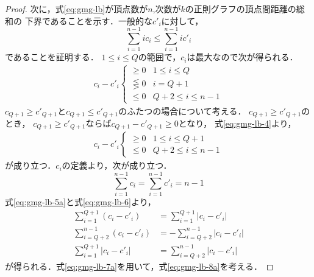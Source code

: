 \begin{proof}
  次に，式\eqref{eq:gmg-lb}が頂点数が$n$,次数が$k$の正則グラフの頂点間距離の総和の
  下界であることを示す．一般的な$c'_i$に対して，
  \begin{equation}
    \label{eq:gmg-lb-3}
    \sum_{i=1}^{n-1}i c_i \leq \sum_{i=1}^{n-1}i c'_i
  \end{equation}
  であることを証明する．
  $1\leq i\leq Q$の範囲で，$c_i$は最大なので次が得られる．
  \begin{equation}
    \label{eq:gmg-lb-4}
    \begin{aligned}
      c_i - c'_i
      \begin{cases}
        \geq 0 & 1\leq i\leq Q \\
        \lesseqgtr 0 & i = Q+1 \\
        \leq 0 & Q+2\leq i\leq n-1
      \end{cases}
    \end{aligned}
  \end{equation}
  $c_{Q+1}\geq c'_{Q+1}$と$c_{Q+1}\leq c'_{Q+1}$のふたつの場合について考える．
  $c_{Q+1}\geq c'_{Q+1}$のとき，
  $c_{Q+1}\geq c'_{Q+1}$ならば$c_{Q+1}-c'_{Q+1}\geq0$となり，
  式\eqref{eq:gmg-lb-4}より，
  \begin{equation}
    \label{eq:gmg-lb-5a}
    \begin{aligned}
      c_i-c'_i
      \begin{cases}
        \geq 0 & 1\leq i\leq Q+1 \\
        \leq 0 & Q+2\leq i\leq n-1
      \end{cases}
    \end{aligned}
  \end{equation}
  が成り立つ．$c_i$の定義より，次が成り立つ．
  \begin{equation}
    \label{eq:gmg-lb-6}
    \sum_{i=1}^{n-1}c_i = \sum_{i=1}^{n-1}c'_i = n-1
  \end{equation}
  式\eqref{eq:gmg-lb-5a}と式\eqref{eq:gmg-lb-6}より，
  \begin{equation}
    \label{eq:gmg-lb-7a}
    \begin{aligned}
      \sum_{i=1}^{Q+1}(c_i-c'_i) &= \sum_{i=1}^{Q+1}|c_i-c'_i| \\
      \sum_{i=Q+2}^{n-1}(c_i-c'_i) &= -\sum_{i=Q+2}^{n-1}|c_i-c'_i| \\
      \sum_{i=1}^{Q+1}|c_i-c'_i| &= \sum_{i=Q+2}^{n-1}|c_i-c'_i|
    \end{aligned}
  \end{equation}
  が得られる．式\eqref{eq:gmg-lb-7a}を用いて，式\eqref{eq:gmg-lb-8a}を考える．

\end{proof}
